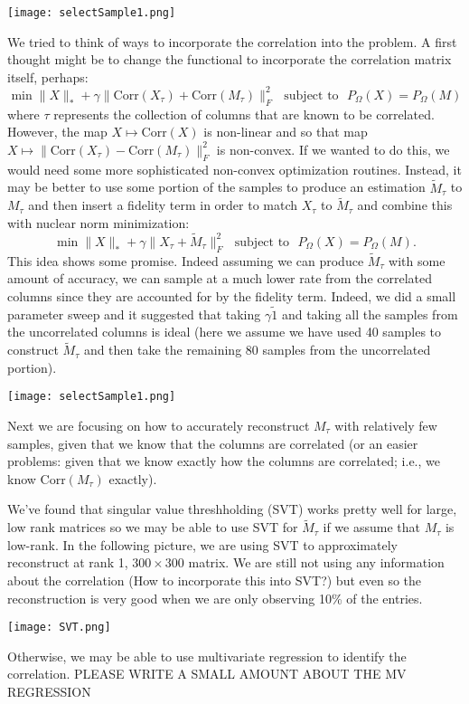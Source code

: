 \documentclass[12pt]{article}
\newcommand{\Corr}{\text{Corr}}
\begin{document}
 \begin{center}
\texttt{[image: selectSample1.png]}\\
\end{center}  
  
\noindent\makebox[\linewidth]{\rule{\textwidth}{2pt}} 
  
 We tried to think of  ways to incorporate the correlation into the problem. A first thought might be to change the functional to incorporate the correlation matrix itself, perhaps: $$\min \| X \|_* + \gamma \| \Corr(X_\tau) + \Corr(M_\tau)\|^2_F \,\,\,\, \text{subject to} \,\,\,\, P_\Omega(X) = P_{\Omega}(M)$$ where $\tau$ represents the collection of columns that are known to be correlated. However, the map $X\mapsto \Corr(X)$ is non-linear and so that map $X\mapsto \| \Corr(X_\tau) - \Corr(M_\tau)\|_F^2$ is non-convex. If we wanted to do this, we would need some more sophisticated non-convex optimization routines. Instead, it may be better to use some portion of the samples to produce an estimation $\tilde M_\tau$ to $M_\tau$ and then insert a fidelity term in order to match $X_\tau$ to $\tilde M_\tau$ and combine this with nuclear norm minimization: $$\min \| X \|_* + \gamma \| X_\tau + \tilde M_\tau\|^2_F \,\,\,\, \text{subject to} \,\,\,\, P_\Omega(X) = P_{\Omega}(M).$$ This idea shows some promise. Indeed assuming we can produce $\tilde M_\tau$ with some amount of accuracy, we can sample at a much lower rate from the correlated columns since they are accounted for by the fidelity term. Indeed, we did a small parameter sweep and it suggested that taking $\gamma \tilde 1$ and taking all the samples from the uncorrelated columns is ideal (here we assume we have used 40 samples to construct $\tilde M_\tau$ and then take the remaining $80$ samples from the uncorrelated portion). 
 
  \begin{center}
\texttt{[image: selectSample1.png]}\\
\end{center}  
  
\noindent\makebox[\linewidth]{\rule{\textwidth}{2pt}} 
  
Next we are focusing on how to accurately reconstruct $M_\tau$ with relatively few samples, given that we know that the columns are correlated (or an easier problems: given that we know exactly how the columns are correlated; i.e., we know $\Corr(M_\tau)$ exactly). 

We've found that singular value threshholding (SVT) works pretty well for large, low rank matrices so we may be able to use SVT for $\tilde M_\tau$ if we assume that $M_\tau$ is low-rank. In the following picture, we are using SVT to approximately reconstruct at rank 1, $300 \times 300$ matrix. We are still not using any information about the correlation (How to incorporate this into SVT?) but even so the reconstruction is very good when we are only observing 10\% of the entries.

  \begin{center}
\texttt{[image: SVT.png]}\\
\end{center}  
 
Otherwise, we may be able to use multivariate regression to identify the correlation. PLEASE WRITE A SMALL AMOUNT ABOUT THE MV REGRESSION
 
 
\end{document}
